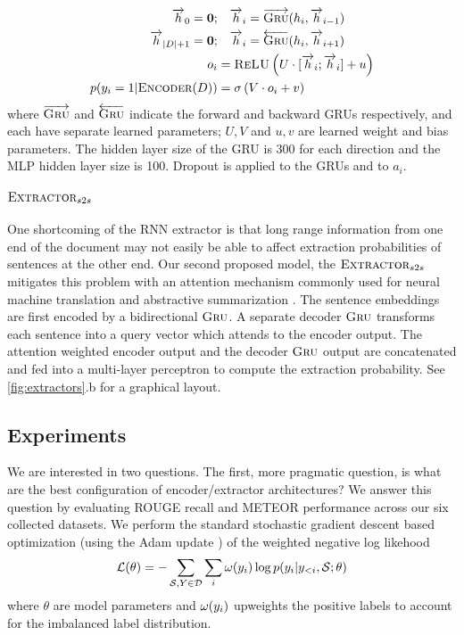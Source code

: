 \newcommand{\rExtHidden}{\overrightarrow{h}}
\newcommand{\lExtHidden}{\overrightarrow{h}}
\newcommand{\docSize}{|\doc|}
\newcommand{\logits}{o}

\begin{align}
    \rExtHidden_0 = \mathbf{0};&\quad   \rExtHidden_i = \rgru(\semb_i, \rExtHidden_{i-1}) \\
    \lExtHidden_{\docSize + 1} = \mathbf{0};&\quad    \lExtHidden_i = \lgru(\semb_i, \lExtHidden_{i+1}) \\
   \logits_i &= \relu\left(U \cdot [\rExtHidden_i; \lExtHidden_i] + u \right)\\
    p(\lbl_i=1|\encoder(\doc)) &= \sigma\left(V\cdot \logits_i + v  \right)
\end{align}
where $\overrightarrow{\textsc{Gru}}$ and $\overleftarrow{\textsc{Gru}}$ indicate the 
forward and backward GRUs respectively, and each have separate learned 
parameters; $U, V$ and $u, v$ are learned weight and bias parameters.
The hidden layer size of the GRU is 300 for each direction and the MLP hidden layer
size is 100. Dropout is applied to the GRUs and to $a_i$.





\paragraph{$\textsc{Extractor}_{s2s}$} One shortcoming of the RNN extractor is that long range
information from one end of the document may not easily be able to affect 
extraction probabilities of sentences at the other end. 
Our second proposed model, the $\textsc{Extractor}_{s2s}$ mitigates this problem with an 
attention 
mechanism commonly
used for neural machine translation \cite{bahdanau2014neural} and 
abstractive summarization \cite{see2017get}. 
The sentence embeddings are first
encoded by a bidirectional $\textsc{Gru}$. A separate decoder $\textsc{Gru}$ transforms each 
sentence into a query vector which attends to the encoder output. The
attention weighted encoder output and the decoder $\textsc{Gru}$ output are concatenated
and fed into a multi-layer perceptron to compute the extraction probability.
See \autoref{fig:extractors}.b for a graphical layout.




\subsection{Experiments}

 We are interested in two questions. The first, more pragmatic question, is
 what are the best configuration of encoder/extractor architectures?
 We answer this question by evaluating ROUGE recall and METEOR \citep{meteor}
 performance across our six collected datasets. We perform the standard
 stochastic gradient descent \cite{sgd} based optimization (using the Adam
 update \cite{adam}) of the weighted negative log likehood 
 \[ \mathcal{L}(\theta) = -\sum_{\mathcal{S}, Y \in \mathcal{D}} 
            \sum_i \omega(y_i) 
        \log p(y_i|y_{<i}, \mathcal{S}; \theta) \]
        where $\theta$ are model parameters and $\omega(y_i)$ upweights
        the positive labels to account for the imbalanced label distribution.

